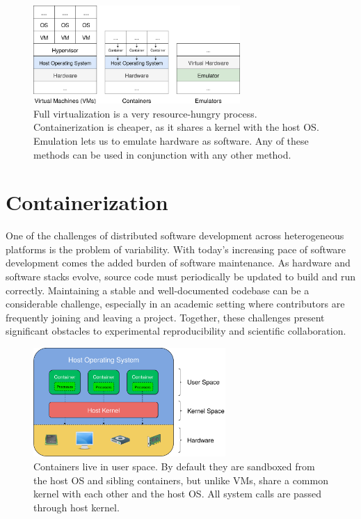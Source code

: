 \documentclass[12pt,initial,twoside,maitrise]{dms}
\numberwithin{equation}{section}
\numberwithin{table}{chapter}
\numberwithin{figure}{chapter}
\begin{document}
\begin{figure}
    \centering
    \includegraphics[width=0.70\textwidth]{vms_containers_emulators.png}
    \caption{Full virtualization is a very resource-hungry process. Containerization is cheaper, as it shares a kernel with the host OS. Emulation lets us to emulate hardware as software. Any of these methods can be used in conjunction with any other method.\vspace{-10pt}}
    \label{fig:vms_containers_emulators}
\end{figure}

\section{Containerization}\label{sec:containerization}

One of the challenges of distributed software development across heterogeneous platforms is the problem of variability. With today's increasing pace of software development comes the added burden of software maintenance. As hardware and software stacks evolve, source code must periodically be updated to build and run correctly. Maintaining a stable and well-documented codebase can be a considerable challenge, especially in an academic setting where contributors are frequently joining and leaving a project. Together, these challenges present significant obstacles to experimental reproducibility and scientific collaboration.

\begin{figure}[ht]
    \centering
    \includegraphics[width=0.65\textwidth]{user_kernel_hardware.png}
    \caption{Containers live in user space. By default they are sandboxed from the host OS and sibling containers, but unlike VMs, share a common kernel with each other and the host OS. All system calls are passed through host kernel.}
    \label{fig:user_kernel_hardware}
\end{figure}
\end{document}
